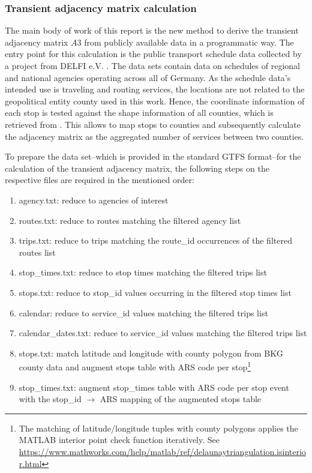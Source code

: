 \subsubsection{Transient adjacency matrix calculation}\label{ssec:transientAdjancencyMatrixCalculation}
The main body of work of this report is the new method to derive the transient adjacency matrix $A3$ from publicly available data in a programmatic way. The entry point for this calculation is the public transport schedule data collected by a project from DELFI e.V. \cite{delfie.v.OpenDataOPNV2021}. The data sets contain data on schedules of regional and national agencies operating across all of Germany. As the schedule data's intended use is traveling and routing services, the locations are not related to the geopolitical entity county used in this work. Hence, the coordinate information of each stop is tested against the shape information of all counties, which is retrieved from \cite{Verwaltungsgebiete2500002020}. This allows to map stops to counties and subsequently calculate the adjacency matrix as the aggregated number of services between two counties.

To prepare the data set--which is provided in the standard GTFS format--for the calculation of the transient adjacency matrix, the following steps on the respective files are required in the mentioned order:

\begin{enumerate}
	\item agency.txt: reduce to agencies of interest
	\item routes.txt: reduce to routes matching the filtered agency list
	\item trips.txt: reduce to trips matching the route\_id occurrences of the filtered routes list
	\item stop\_times.txt: reduce to stop times matching the filtered trips list
	\item stops.txt: reduce to stop\_id values occurring in the filtered stop times list
	\item calendar: reduce to service\_id values matching the filtered trips list
	\item calendar\_dates.txt: reduce to service\_id values matching the filtered trips list
	\item stops.txt: match latitude and longitude with county polygon from BKG county data and augment stops table with ARS code per stop\footnote{The matching of latitude/longitude tuples with county polygons applies the MATLAB interior point check function iteratively. See \url{https://www.mathworks.com/help/matlab/ref/delaunaytriangulation.isinterior.html}}
	\item stop\_times.txt: augment stop\_times table with ARS code per stop event with the stop\_id $\rightarrow$ ARS mapping of the augmented stops table
\end{enumerate}


